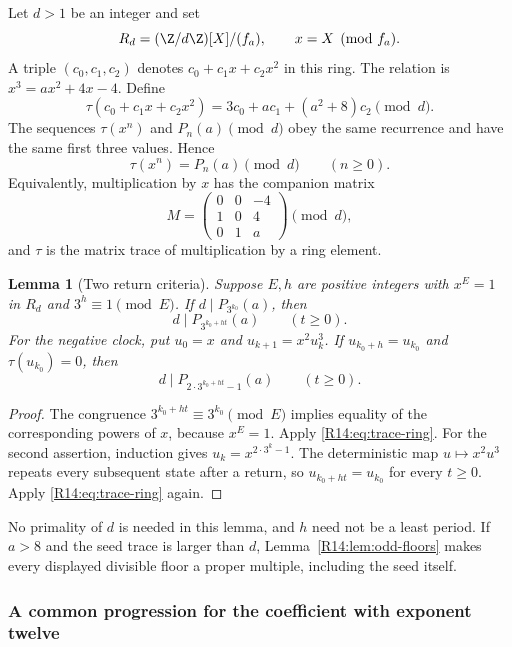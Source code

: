 \documentclass[11pt,a4paper]{article}
\newtheorem{lemma}[theorem]{Lemma}\newtheorem{proposition}[theorem]{Proposition}
\theoremstyle{definition}\newtheorem{definition}[theorem]{Definition}
\theoremstyle{remark}\newtheorem{remark}[theorem]{Remark}
\begin{document}
Let $d>1$ be an integer and set
\[
 R_d=(\Z/d\Z)[X]/(f_a),\qquad x=X\pmod{f_a}.
\]
A triple $(c_0,c_1,c_2)$ denotes $c_0+c_1x+c_2x^2$ in this ring.
The relation is $x^3=ax^2+4x-4$. Define
\begin{equation}\label{R14:eq:tau}
 \tau(c_0+c_1x+c_2x^2)
 =3c_0+ac_1+(a^2+8)c_2\pmod d.
\end{equation}
The sequences $\tau(x^n)$ and $P_n(a)\pmod d$ obey the same
recurrence and have the same first three values. Hence
\begin{equation}\label{R14:eq:trace-ring}
 \tau(x^n)=P_n(a)\pmod d\qquad(n\ge0).
\end{equation}
Equivalently, multiplication by $x$ has the companion matrix
\begin{equation}\label{R14:eq:companion}
 M=\begin{pmatrix}0&0&-4\\1&0&4\\0&1&a\end{pmatrix}
 \pmod d,
\end{equation}
and $\tau$ is the matrix trace of multiplication by a ring element.

\begin{lemma}[Two return criteria]\label{R14:lem:returns}
Suppose $E,h$ are positive integers with $x^E=1$ in $R_d$ and
$3^h\equiv1\pmod E$. If $d\mid P_{3^{k_0}}(a)$, then
\[
 d\mid P_{3^{k_0+ht}}(a)\qquad(t\ge0).
\]
For the negative clock, put $u_0=x$ and
$u_{k+1}=x^2u_k^3$. If $u_{k_0+h}=u_{k_0}$ and
$\tau(u_{k_0})=0$, then
\[
 d\mid P_{2\cdot3^{k_0+ht}-1}(a)\qquad(t\ge0).
\]
\end{lemma}

\begin{proof}
The congruence $3^{k_0+ht}\equiv3^{k_0}\pmod E$ implies equality
of the corresponding powers of $x$, because $x^E=1$. Apply
\eqref{R14:eq:trace-ring}. For the second assertion, induction gives
$u_k=x^{2\cdot3^k-1}$. The deterministic map $u\mapsto x^2u^3$
repeats every subsequent state after a return, so
$u_{k_0+ht}=u_{k_0}$ for every $t\ge0$. Apply
\eqref{R14:eq:trace-ring} again.
\end{proof}

No primality of $d$ is needed in this lemma, and $h$ need not be a
least period. If $a>8$ and the seed trace is larger than $d$,
Lemma~\ref{R14:lem:odd-floors} makes every displayed divisible floor a
proper multiple, including the seed itself.

\subsubsection{A common progression for the coefficient with exponent twelve}
\end{document}
